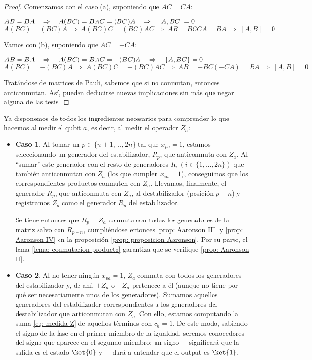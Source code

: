 \documentclass[11pt,a4paper,twoside,pdf]{article}
\numberwithin{equation}{section}
\begin{document}
		\begin{proof}
			Comenzamos con el caso (a), suponiendo que $AC=CA$: 
			\begin{center}
				$AB=BA \quad \Rightarrow \quad A(BC)=BAC=(BC)A  \quad \Rightarrow \quad [A,BC]=0 \newline$
				$A(BC)=(BC)A \: \Rightarrow \: A(BC)C=(BC)AC \: \Rightarrow \: AB=BCCA=BA \: \Rightarrow \: [A,B]=0$
			\end{center}
			Vamos con (b), suponiendo que $AC=-CA$:
			\begin{center}
				$AB=BA \quad \Rightarrow \quad A(BC)=BAC=-(BC)A  \quad \Rightarrow \quad \{A,BC\}=0 \newline$
				$A(BC)=-(BC)A \: \Rightarrow \: A(BC)C=-(BC)AC \: \Rightarrow \: AB=-BC(-CA)=BA \: \Rightarrow \: [A,B]=0$
			\end{center}
			Tratándose de matrices de Pauli, sabemos que si no conmutan, entonces anticonmutan. Así, pueden deducirse nuevas implicaciones sin más que negar alguna de las tesis.
		\end{proof}
		
 \vspace{0.2cm}
		
	Ya disponemos de todos los ingredientes necesarios para comprender lo que hacemos al medir el qubit $a$, es decir, al medir el operador $Z_a$: 
	\begin{itemize}[leftmargin=0cm]	
	\item[] \textbf{Caso 1}. Al tomar un $p\in\{n+1,...,2n\}$ tal que $x_{pa}=1$, estamos seleccionando un generador del estabilizador, $R_p$, que anticonmuta con $Z_a$. Al ``sumar'' este generador con el resto de generadores $R_i \: (i\in \{1,...,2n\})$  que también anticonmutan con $Z_a$ (los que cumplen $x_{ia}=1$), conseguimos que los correspondientes productos conmuten con $Z_a$. Llevamos, finalmente, el generador $R_p$, que anticonmuta con $Z_a$, al destabilizador (posición $p-n$) y registramos $Z_a$ como el generador $R_p$ del estabilizador.
	 
	Se tiene entonces que $R_p=Z_a$ conmuta con todas los generadores de la matriz salvo con $R_{p-n}$, cumpliéndose entonces \ref{prop: Aaronson III} y \ref{prop: Aaronson IV} en la proposición \ref{prop: proposicion Aaronson}. Por su parte, el lema \ref{lema: conmutacion producto} garantiza que se verifique \ref{prop: Aaronson II}.
		
	\item[] \textbf{Caso 2}. Al no tener ningún $x_{pa}=1$, $Z_a$ conmuta con todos los generadores del estabilizador y, de ahí,  $+Z_a$ o $-Z_a$ pertenece a él (aunque no tiene por qué ser necesariamente unos de los generadores). Sumamos aquellos generadores del estabilizador correspondientes a los generadores del destabilizador que anticonmutan con $Z_a$. Con ello, estamos computando la suma \eqref{eq: medida Z} de aquellos términos con $c_h=1$. De este modo, sabiendo el signo de la fase en el primer miembro de la igualdad, seremos conocedores del signo que aparece en el segundo miembro: un signo $+$ significará que la salida es el estado $\ket{0}$ y $-$ dará a entender que el output es $\ket{1}$.
	
	\end{itemize}
 	
\end{document}
